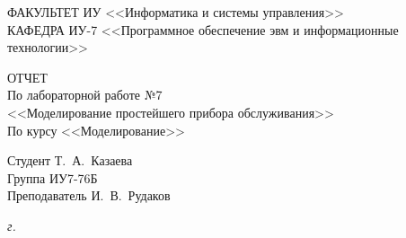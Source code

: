 \begin{titlepage}
	{
		\small \raggedright
		ФАКУЛЬТЕТ ИУ <<Информатика и системы управления>> \\
		\vspace{3.3mm}
		КАФЕДРА ИУ-7 <<Программное обеспечение эвм и информационные технологии>> \\
	}

	\vspace{15.8mm}

	{
		\LARGE
		ОТЧЕТ \\
	}
	\vspace{5mm}
	{
		\large
		По лабораторной работе №7 \\
		\vspace{2mm}
		<<Моделирование простейшего прибора обслуживания>> \\
		\vspace{2mm}
		По курсу <<Моделирование>>
	}

	\vfill

	Студент \hspace*{2.5cm} \hfill  Т.~А.~Казаева\\
	Группа \hspace*{2.5cm} \hfill  	ИУ7-76Б\\
	Преподаватель \hspace*{2.5cm} \hfill  И.~В.~Рудаков\\
	
	
	\vspace{20mm}
	
	\textit{{\the\year} г.}
	
\end{titlepage}